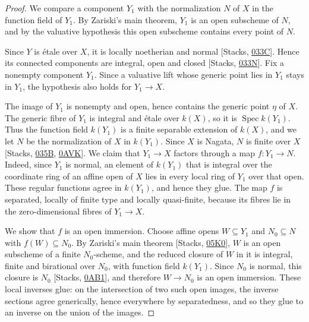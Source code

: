 \documentclass[11pt]{article}
\begin{document}
\begin{proof}[{Proof}]\label{bp27}%
We compare a component \(Y_1\) with the normalization \(N\) of \(X\) in the function field of \(Y_1\). By Zariski's main theorem, \(Y_1\) is an open subscheme of \(N\), and by the valuative hypothesis this open subscheme contains every point of \(N\).

Since \(Y\) is étale over \(X\), it is locally noetherian and normal [Stacks, \href{https://stacks.math.columbia.edu/tag/033C}{033C}]. Hence its connected components are integral, open and closed [Stacks, \href{https://stacks.math.columbia.edu/tag/033N}{033N}]. Fix a nonempty component \(Y_1\). Since a valuative lift whose generic point lies in \(Y_1\) stays in \(Y_1\), the hypothesis also holds for \(Y_1\to X\).

The image of \(Y_1\) is nonempty and open, hence contains the generic point \(\eta\) of \(X\). The generic fibre of \(Y_1\) is integral and étale over \(k(X)\), so it is \(\operatorname{Spec}k(Y_1)\). Thus the function field \(k(Y_1)\) is a finite separable extension of \(k(X)\), and we let \(N\) be the normalization of \(X\) in \(k(Y_1)\). Since \(X\) is Nagata, \(N\) is finite over \(X\) [Stacks, \href{https://stacks.math.columbia.edu/tag/035B}{035B}, \href{https://stacks.math.columbia.edu/tag/0AVK}{0AVK}]. We claim that \(Y_1\to X\) factors through a map \(f:Y_1\to N\). Indeed, since \(Y_1\) is normal, an element of \(k(Y_1)\) that is integral over the coordinate ring of an affine open of \(X\) lies in every local ring of \(Y_1\) over that open. These regular functions agree in \(k(Y_1)\), and hence they glue. The map \(f\) is separated, locally of finite type and locally quasi-finite, because its fibres lie in the zero-dimensional fibres of \(Y_1\to X\).

We show that \(f\) is an open immersion. Choose affine opens \(W\subseteq Y_1\) and \(N_0\subseteq N\) with \(f(W)\subseteq N_0\). By Zariski's main theorem [Stacks, \href{https://stacks.math.columbia.edu/tag/05K0}{05K0}], \(W\) is an open subscheme of a finite \(N_0\)-scheme, and the reduced closure of \(W\) in it is integral, finite and birational over \(N_0\), with function field \(k(Y_1)\). Since \(N_0\) is normal, this closure is \(N_0\) [Stacks, \href{https://stacks.math.columbia.edu/tag/0AB1}{0AB1}], and therefore \(W\to N_0\) is an open immersion. These local inverses glue: on the intersection of two such open images, the inverse sections agree generically, hence everywhere by separatedness, and so they glue to an inverse on the union of the images.


\end{proof}
\end{document}
